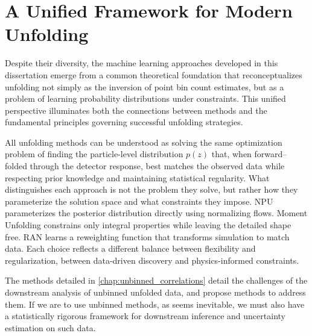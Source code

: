 \section{A Unified Framework for Modern Unfolding}
    Despite their diversity, the machine learning approaches developed in this dissertation emerge from a common theoretical foundation that reconceptualizes unfolding not simply as the inversion of point bin count estimates, but as a problem of learning probability distributions under constraints.
    This unified perspective illuminates both the connections between methods and the fundamental principles governing successful unfolding strategies.
    
    All unfolding methods can be understood as solving the same optimization problem of finding the particle-level distribution \(p(z)\) that, when forward--folded through the detector response, best matches the observed data while respecting prior knowledge and maintaining statistical regularity.
    What distinguishes each approach is not the problem they solve, but rather how they parameterize the solution space and what constraints they impose.
    NPU parameterizes the posterior distribution directly using normalizing flows.
    Moment Unfolding constrains only integral properties while leaving the detailed shape free.
    RAN learns a reweighting function that transforms simulation to match data.
    Each choice reflects a different balance between flexibility and regularization, between data-driven discovery and physics-informed constraints.

    The methods detailed in \cref{chap:unbinned_correlations} detail the challenges of the downstream analysis of unbinned unfolded data, and propose methods to address them.
    If we are to use unbinned methods, as seems inevitable, we must also have a statistically rigorous framework for downstream inference and uncertainty estimation on such data.

